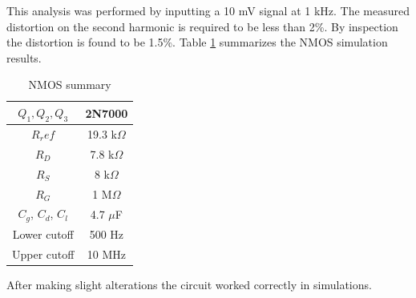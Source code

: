 	This analysis was performed by inputting a 10 mV signal at 1 kHz. The measured distortion on the second harmonic is required to be less than 2\%. By inspection the distortion is found to be 1.5\%. Table \ref{tab:nmossum} summarizes the NMOS simulation results.
	
	
	\begin{table}[H]
		\centering
		\caption{NMOS summary}
		\label{tab:nmossum}
		\begin{tabular}{cc}
			$Q_1, Q_2, Q_3$ & 2N7000        \\ \hline
			$R_ref$         & 19.3 k$\Omega$ \\ \hline
			$R_D$           & 7.8 k$\Omega$  \\ \hline
			$R_S$           & 8 k$\Omega$   \\ \hline
			$R_G$           & 1 M$\Omega$  \\ \hline
			$C_g$, $C_d$, $C_l$ & 4.7 $\mu$F   \\ \hline
			Lower cutoff    &  500 Hz \\    \hline
			Upper cutoff    & 10 MHz \\    \hline
			
			     
		\end{tabular}
	\end{table}

After making slight alterations the circuit worked correctly in simulations.
	
	
	
	
	